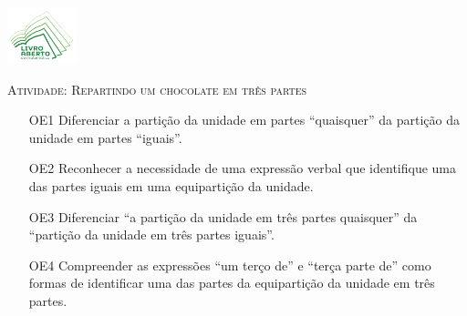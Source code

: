 \documentclass[10 pt,usenames,dvipsnames, oneside]{article}
\begin{document}
\begin{center}
  \begin{minipage}[l]{3cm}
\includegraphics[width=2cm]{../../../Figuras/logo}       
\end{minipage}\hfill
\begin{minipage}[r]{.8\textwidth}
 {\Large \scshape Atividade: Repartindo um chocolate em três partes}  
\end{minipage}
\end{center}
\vspace{.2cm}

\ifdefined\prof
\begin{goals}

\begin{enumerate}

\item[OE1] Diferenciar a partição da unidade em partes “quaisquer”
da partição da unidade em partes “iguais”.
\item[OE2] Reconhecer a necessidade de uma expressão verbal
que identifique uma das partes iguais em uma equipartição
da unidade.
\item[OE3] Diferenciar “a partição da unidade em três partes
quaisquer” da “partição da unidade em três partes
iguais”.
\item[OE4] Compreender as expressões “um terço de” e “terça
parte de” como formas de identificar uma das partes da
equipartição da unidade em três partes.

\end{enumerate}

\tcblower


\end{goals}
\end{document}

